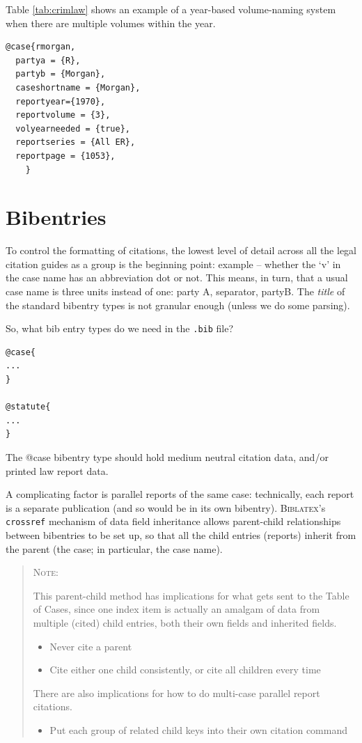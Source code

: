 \bigskip
Table \ref{tab:crimlaw} shows an example of a year-based volume-naming system when there are multiple volumes within the year.

{\small
\begin{verbatim}
@case{rmorgan,
  partya = {R}, 
  partyb = {Morgan},
  caseshortname = {Morgan},
  reportyear={1970},
  reportvolume = {3},
  volyearneeded = {true},
  reportseries = {All ER},
  reportpage = {1053},
	}
\end{verbatim}
}

 \newpage



\section{Bibentries}
To control the formatting of citations, the lowest level of detail across all the legal citation guides as a group is the beginning point: example -- whether the `v' in the case name has an abbreviation dot or not. This means, in turn, that a usual case name is three units instead of one: party A, separator, partyB. The \textit{title} of the standard bibentry types is not granular enough (unless we do some parsing).

So, what bib entry types do we need in the \verb|.bib| file?
\begin{verbatim}
@case{
...
}

@statute{
...
}
\end{verbatim}

The @case bibentry type should hold medium neutral citation data, and/or printed law report data. 

A complicating factor is parallel reports of the same case: technically, each report is a separate publication (and so would be in its own bibentry). \textsc{Biblatex}'s \texttt{crossref} mechanism of data field inheritance allows parent-child relationships between bibentries to be set up, so that all the child entries (reports) inherit from the parent (the case; in particular, the case name). 


\begin{quotation}
\noindent\info \textsc{Note}:

\noindent This parent-child method has implications for what gets sent to the Table of Cases, since one index item is actually an amalgam of data from multiple (cited) child entries, both their own fields and inherited fields. 
\begin{itemize}
\item Never cite a parent
\item Cite either one child consistently, or cite all children every time
\end{itemize}

\noindent There are also implications for how to do multi-case parallel report citations. 
\begin{itemize}
\item Put each group of related child keys into their own citation command
\end{itemize}

\end{quotation}
\bigskip


